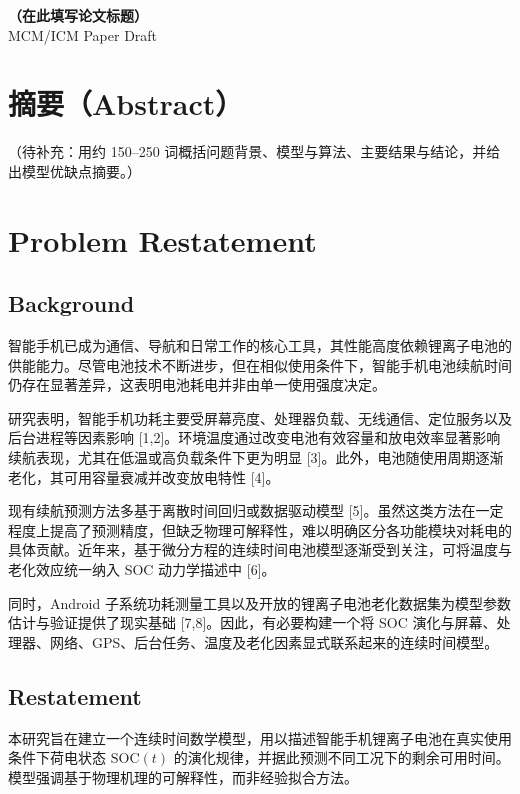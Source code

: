 \documentclass[11pt]{article}
\begin{document}
\begin{center}
  {\LARGE \textbf{（在此填写论文标题）}}\\[0.5em]
  {\large MCM/ICM Paper Draft}\par
\end{center}

\section*{摘要（Abstract）}
（待补充：用约 150--250 词概括问题背景、模型与算法、主要结果与结论，并给出模型优缺点摘要。）

\section{Problem Restatement}
\subsection{Background}
智能手机已成为通信、导航和日常工作的核心工具，其性能高度依赖锂离子电池的供能能力。尽管电池技术不断进步，但在相似使用条件下，智能手机电池续航时间仍存在显著差异，这表明电池耗电并非由单一使用强度决定。

研究表明，智能手机功耗主要受屏幕亮度、处理器负载、无线通信、定位服务以及后台进程等因素影响 [1,2]。环境温度通过改变电池有效容量和放电效率显著影响续航表现，尤其在低温或高负载条件下更为明显 [3]。此外，电池随使用周期逐渐老化，其可用容量衰减并改变放电特性 [4]。

现有续航预测方法多基于离散时间回归或数据驱动模型 [5]。虽然这类方法在一定程度上提高了预测精度，但缺乏物理可解释性，难以明确区分各功能模块对耗电的具体贡献。近年来，基于微分方程的连续时间电池模型逐渐受到关注，可将温度与老化效应统一纳入 SOC 动力学描述中 [6]。

同时，Android 子系统功耗测量工具以及开放的锂离子电池老化数据集为模型参数估计与验证提供了现实基础 [7,8]。因此，有必要构建一个将 SOC 演化与屏幕、处理器、网络、GPS、后台任务、温度及老化因素显式联系起来的连续时间模型。


\subsection{Restatement}

本研究旨在建立一个连续时间数学模型，用以描述智能手机锂离子电池在真实使用条件下荷电状态 $\mathrm{SOC}(t)$ 的演化规律，并据此预测不同工况下的剩余可用时间。模型强调基于物理机理的可解释性，而非经验拟合方法。
\end{document}
